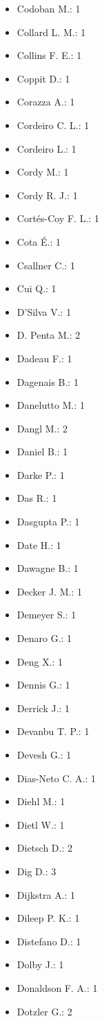 \begin{itemize}
\item Codoban M.: 1
\item Collard L. M.: 1
\item Collins F. E.: 1
\item Coppit D.: 1
\item Corazza A.: 1
\item Cordeiro C. L.: 1
\item Cordeiro L.: 1
\item Cordy M.: 1
\item Cordy R. J.: 1
\item Cort{\'e}s-Coy F. L.: 1
\item Cota É.: 1
\item Csallner C.: 1
\item Cui Q.: 1
\item D'Silva V.: 1
\item D. Penta M.: 2
\item Dadeau F.: 1
\item Dagenais B.: 1
\item Danelutto M.: 1
\item Dangl M.: 2
\item Daniel B.: 1
\item Darke P.: 1
\item Das R.: 1
\item Dasgupta P.: 1
\item Date H.: 1
\item Dawagne B.: 1
\item Decker J. M.: 1
\item Demeyer S.: 1
\item Denaro G.: 1
\item Deng X.: 1
\item Dennis G.: 1
\item Derrick J.: 1
\item Devanbu T. P.: 1
\item Devesh G.: 1
\item Dias-Neto C. A.: 1
\item Diehl M.: 1
\item Dietl W.: 1
\item Dietsch D.: 2
\item Dig D.: 3
\item Dijkstra A.: 1
\item Dileep P. K.: 1
\item Distefano D.: 1
\item Dolby J.: 1
\item Donaldson F. A.: 1
\item Dotzler G.: 2

\end{itemize}
